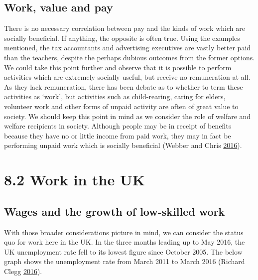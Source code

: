 \documentclass[]{tufte-handout}
\begin{document}
\hypertarget{work-value-and-pay}{%
\subsection{Work, value and pay}\label{work-value-and-pay}}

There is no necessary correlation between pay and the kinds of work
which are socially beneficial. If anything, the opposite is often true.
Using the examples mentioned, the tax accountants and advertising
executives are vastly better paid than the teachers, despite the perhaps
dubious outcomes from the former options. We could take this point
further and observe that it is possible to perform activities which are
extremely socially useful, but receive no remuneration at all. As they
lack remuneration, there has been debate as to whether to term these
activities as `work', but activities such as child-rearing, caring for
elders, volunteer work and other forms of unpaid activity are often of
great value to society. We should keep this point in mind as we consider
the role of welfare and welfare recipients in society. Although people
may be in receipt of benefits because they have no or little income from
paid work, they may in fact be performing unpaid work which is socially
beneficial (Webber and Chris \protect\hyperlink{ref-Webber2016}{2016}).

\hypertarget{work-in-the-uk}{%
\section{8.2 Work in the UK}\label{work-in-the-uk}}

\hypertarget{wages-and-the-growth-of-low-skilled-work}{%
\subsection{Wages and the growth of low-skilled
work}\label{wages-and-the-growth-of-low-skilled-work}}

With those broader considerations picture in mind, we can consider the
status quo for work here in the UK. In the three months leading up to
May 2016, the UK unemployment rate fell to its lowest figure since
October 2005. The below graph shows the unemployment rate from March
2011 to March 2016 (Richard Clegg
\protect\hyperlink{ref-RichardClegg2016}{2016}).
\end{document}
